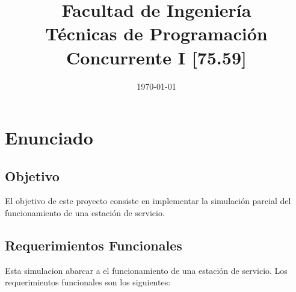 \documentclass[12pt,a4paper,titlepage,oneside]{article}
\title{Facultad de Ingeniería\\Técnicas de Programación Concurrente I [75.59]}
\date{\today}
\begin{document}
    \fancyhead[LE]{\leftmark} 
    \fancyhead[RO]{\rightmark} 
    \renewcommand{\headrulewidth}{0.4pt} 
    \renewcommand{\footrulewidth}{0pt}

    \pagestyle{fancy}


 \maketitle
  \setcounter{page}{1}
  \tableofcontents

\newpage{}
\setcounter{page}{1}

\section{Enunciado}

\subsection{Objetivo}

El objetivo de este proyecto consiste en implementar la simulación parcial del funcionamiento de una estación de servicio.

\subsection{Requerimientos Funcionales}

Esta simulacion abarcar a el funcionamiento de una estación de servicio. Los requerimientos funcionales son los siguientes:
\end{document}
